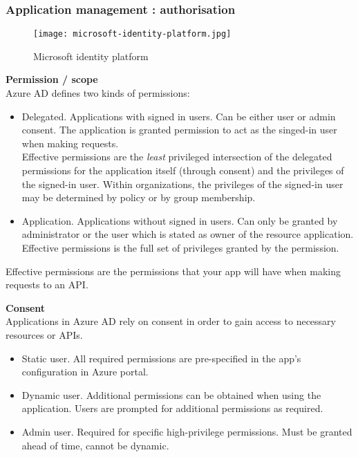 \subsubsection{Application management : authorisation}
\begin{figure}[!h]
\texttt{[image: microsoft-identity-platform.jpg]}
\caption{Microsoft identity platform}
\end{figure}

\textbf{Permission / scope} \\
Azure AD defines two kinds of permissions:
\begin{itemize}
\item Delegated. Applications with signed in users. Can be either user or admin consent. The application is granted permission to act as the singed-in user when making requests. \\ Effective permissions are the \textit{least} privileged intersection of the delegated permissions for the application itself (through consent) and the privileges of the signed-in user. Within organizations, the privileges of the signed-in user may be determined by policy or by group membership.
\item Application. Applications without signed in users. Can only be granted by administrator or the user which is stated as owner of the resource application. \\ Effective permissions is the full set of privileges granted by the permission.
\end{itemize}
Effective permissions are the permissions that your app will have when making requests to an API.

\textbf{Consent} \\
Applications in Azure AD rely on consent in order to gain access to necessary resources or APIs.
\begin{itemize}
\item Static user. All required permissions are pre-specified in the app's configuration in Azure portal.
\item Dynamic user. Additional permissions can be obtained when using the application. Users are prompted for additional permissions as required.
\item Admin user. Required for specific high-privilege permissions. Must be granted ahead of time, cannot be dynamic. 
\end{itemize}


